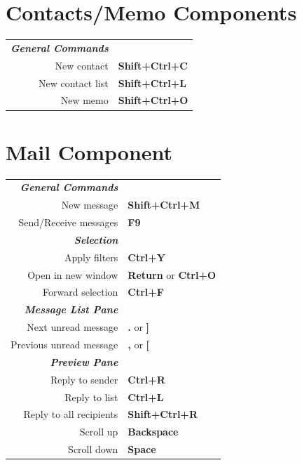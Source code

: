 \documentclass[12pt]{article}
\begin{document}
\begin{landscape}
\begin{center}
\begin{multicols}{2}
	\section*{Contacts/Memo Components}
	\begin{tabular*}{4in}{rp{1.5in}}
		\textit{\textbf{General Commands}}	&					\\
		New contact				& \textbf{Shift+Ctrl+C}			\\
		New contact list			& \textbf{Shift+Ctrl+L}			\\
		New memo				& \textbf{Shift+Ctrl+O}			\\
	\end{tabular*}
	\section*{Mail Component}
	\begin{tabular*}{4in}{rp{1.5in}}
		\textit{\textbf{General Commands}}	&					\\
		New message				& \textbf{Shift+Ctrl+M}			\\
		\vspace{1.5mm}
		Send/Receive messages			& \textbf{F9}				\\
		\textit{\textbf{Selection}}		&					\\
		Apply filters				& \textbf{Ctrl+Y}			\\
		Open in new window 			& \textbf{Return} or \textbf{Ctrl+O}	\\
		\vspace{1.5mm}
		Forward selection			& \textbf{Ctrl+F}			\\
		\textit{\textbf{Message List Pane}}	&					\\
		Next unread message			& \textbf{.} or \textbf{]}		\\
		\vspace{1.5mm}
		Previous unread message			& \textbf{,} or \textbf{[}		\\
		\textit{\textbf{Preview Pane}}		&					\\
		Reply to sender				& \textbf{Ctrl+R}			\\
		Reply to list				& \textbf{Ctrl+L}			\\
		Reply to all recipients 		& \textbf{Shift+Ctrl+R}			\\
		Scroll up				& \textbf{Backspace}			\\
		Scroll down				& \textbf{Space}			\\
	\end{tabular*}

\end{multicols}
\end{center}
\end{landscape}
\end{document}
